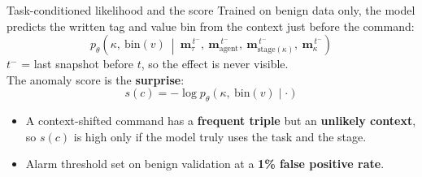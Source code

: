 \documentclass[aspectratio=169]{beamer}
\newcommand{\key}[1]{\textcolor{accent}{\textbf{#1}}}
\begin{document}
\begin{frame}{Task-conditioned likelihood and the score}
Trained on benign data only, the model predicts the written tag and value bin
from the context just before the command:
\begin{equation*}
  p_\theta\!\left(\kappa,\ \mathrm{bin}(v)\ \middle|\
  \mathbf{m}_{\tau}^{\,t^-},\
  \mathbf{m}_{\text{agent}}^{\,t^-},\
  \mathbf{m}_{\text{stage}(\kappa)}^{\,t^-},\
  \mathbf{m}_{\kappa}^{\,t^-}\right)
\end{equation*}
\centering\footnotesize\textcolor{muted}{$t^-$ = last snapshot before $t$, so the effect is never visible.}
\\[0.6em]
\flushleft
The anomaly score is the \key{surprise}:
\begin{equation*}
  s(c) = -\log p_\theta\!\left(\kappa,\ \mathrm{bin}(v)\mid\cdot\right)
\end{equation*}
\begin{itemize}
  \item A context-shifted command has a \key{frequent triple} but an
        \key{unlikely context}, so $s(c)$ is high only if the model truly uses
        the task and the stage.
  \item Alarm threshold set on benign validation at a \key{1\% false positive rate}.
\end{itemize}
\end{frame}
\end{document}
